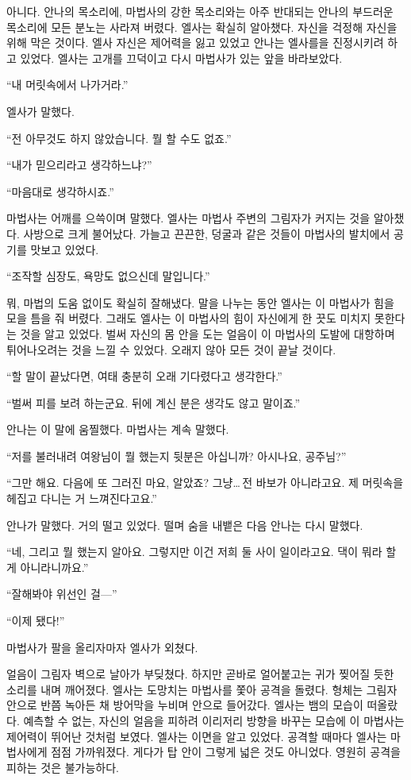 아니다. 안나의 목소리에, 마법사의 강한 목소리와는 아주 반대되는 안나의 부드러운 목소리에 모든 분노는 사라져 버렸다. 엘사는 확실히 알아챘다. 자신을 걱정해 자신을 위해 막은 것이다. 엘사 자신은 제어력을 잃고 있었고 안나는 엘사를을 진정시키려 하고 있었다. 엘사는 고개를 끄덕이고 다시 마법사가 있는 앞을 바라보았다.

``내 머릿속에서 나가거라.''

엘사가 말했다.

``전 아무것도 하지 않았습니다. 뭘 할 수도 없죠.''

``내가 믿으리라고 생각하느냐?''

``마음대로 생각하시죠.''

마법사는 어깨를 으쓱이며 말했다. 엘사는 마법사 주변의 그림자가 커지는 것을 알아챘다. 사방으로 크게 불어났다. 가늘고 끈끈한, 덩굴과 같은 것들이 마법사의 발치에서 공기를 맛보고 있었다.

``조작할 심장도, 욕망도 없으신데 말입니다.''

뭐, 마법의 도움 없이도 확실히 잘해냈다. 말을 나누는 동안 엘사는 이 마법사가 힘을 모을 틈을 줘 버렸다. 그래도 엘사는 이 마법사의 힘이 자신에게 한 끗도 미치지 못한다는 것을 알고 있었다. 벌써 자신의 몸 안을 도는 얼음이 이 마법사의 도발에 대항하며 튀어나오려는 것을 느낄 수 있었다. 오래지 않아 모든 것이 끝날 것이다.

``할 말이 끝났다면, 여태 충분히 오래 기다렸다고 생각한다.''

``벌써 피를 보려 하는군요. 뒤에 계신 분은 생각도 않고 말이죠.''

안나는 이 말에 움찔했다. 마법사는 계속 말했다.

``저를 불러내려 여왕님이 뭘 했는지 뒷분은 아십니까? 아시나요, 공주님?''

``그만 해요. 다음에 또 그러진 마요, 알았죠? 그냥\ldots\,전 바보가 아니라고요. 제 머릿속을 헤집고 다니는 거 느껴진다고요.''

안나가 말했다. 거의 떨고 있었다. 떨며 숨을 내뱉은 다음 안나는 다시 말했다.

``네, 그리고 뭘 했는지 알아요. 그렇지만 이건 저희 둘 사이 일이라고요. 댁이 뭐라 할 게 아니라니까요.''

``잘해봐야 위선인 걸—''

``이제 됐다!''

마법사가 팔을 올리자마자 엘사가 외쳤다.

얼음이 그림자 벽으로 날아가 부딪쳤다. 하지만 곧바로 얼어붙고는 귀가 찢어질 듯한 소리를 내며 깨어졌다. 엘사는 도망치는 마법사를 쫓아 공격을 돌렸다. 형체는 그림자 안으로 반쯤 녹아든 채 방어막을 누비며 안으로 들어갔다. 엘사는 뱀의 모습이 떠올랐다. 예측할 수 없는, 자신의 얼음을 피하려 이리저리 방향을 바꾸는 모습에 이 마법사는 제어력이 뛰어난 것처럼 보였다. 엘사는 이면을 알고 있었다. 공격할 때마다 엘사는 마법사에게 점점 가까워졌다. 게다가 탑 안이 그렇게 넓은 것도 아니었다. 영원히 공격을 피하는 것은 불가능하다.

